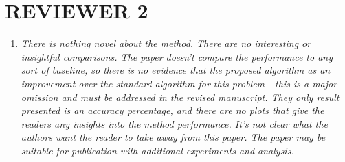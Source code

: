 \section{REVIEWER 2}
\begin{enumerate}
\item \textsl{There is nothing novel about the method. There are no interesting or insightful comparisons. The paper doesn't compare the performance to any sort of baseline, so there is no evidence that the proposed algorithm as an improvement over the standard algorithm for this problem - this is a major omission and must be addressed in the revised manuscript. They only result presented is an accuracy percentage, and there are no  plots that give the readers any insights into the method performance. It's not clear what the authors want the reader to take away from this paper. The paper may be suitable for publication with additional experiments and analysis.}\\


\end{enumerate}
